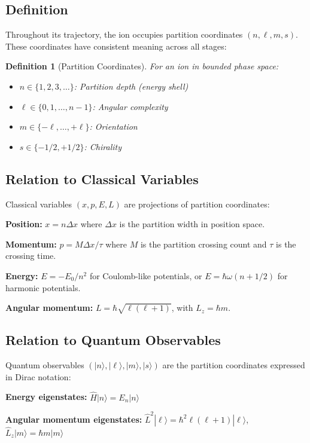 \documentclass[twocolumn,10pt]{article}
\newtheorem{definition}[theorem]{Definition}
\theoremstyle{remark}
\begin{document}
\subsection{Definition}

Throughout its trajectory, the ion occupies partition coordinates $(n, \ell, m, s)$. These coordinates have consistent meaning across all stages:

\begin{definition}[Partition Coordinates]
For an ion in bounded phase space:
\begin{itemize}
    \item $n \in \{1, 2, 3, \ldots\}$: Partition depth (energy shell)
    \item $\ell \in \{0, 1, \ldots, n-1\}$: Angular complexity
    \item $m \in \{-\ell, \ldots, +\ell\}$: Orientation
    \item $s \in \{-1/2, +1/2\}$: Chirality
\end{itemize}
\end{definition}

\subsection{Relation to Classical Variables}

Classical variables $(x, p, E, L)$ are projections of partition coordinates:

\textbf{Position:} $x = n \Delta x$ where $\Delta x$ is the partition width in position space.

\textbf{Momentum:} $p = M \Delta x / \tau$ where $M$ is the partition crossing count and $\tau$ is the crossing time.

\textbf{Energy:} $E = -E_0 / n^2$ for Coulomb-like potentials, or $E = \hbar\omega(n + 1/2)$ for harmonic potentials.

\textbf{Angular momentum:} $L = \hbar\sqrt{\ell(\ell+1)}$, with $L_z = \hbar m$.

\subsection{Relation to Quantum Observables}

Quantum observables $(|n\rangle, |\ell\rangle, |m\rangle, |s\rangle)$ are the partition coordinates expressed in Dirac notation:

\textbf{Energy eigenstates:} $\hat{H}|n\rangle = E_n |n\rangle$

\textbf{Angular momentum eigenstates:} $\hat{L}^2|\ell\rangle = \hbar^2 \ell(\ell+1)|\ell\rangle$, $\hat{L}_z|m\rangle = \hbar m|m\rangle$
\end{document}
